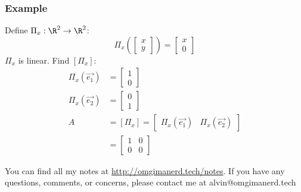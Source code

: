 \documentclass{math}
\begin{document}
\subsubsection*{Example}
Define \( \Pi_x:\R^2\to\R^2 \):
\[ \Pi_x\left(\begin{bmatrix}x \\ y\end{bmatrix}\right) = \begin{bmatrix}x \\
  0\end{bmatrix} \]
\( \Pi_x \) is linear. Find \( [\Pi_x] \):
\begin{align*}
  \Pi_x(\vec{e_1}) &= \begin{bmatrix}1 \\ 0\end{bmatrix} \\
  \Pi_x(\vec{e_2}) &= \begin{bmatrix}0 \\ 1\end{bmatrix} \\
  A &= [\Pi_x] = \begin{bmatrix}
    \Pi_x(\vec{e_1}) & \Pi_x(\vec{e_2})
  \end{bmatrix} \\
  &= \begin{bmatrix}
    1 & 0 \\
    0 & 0
  \end{bmatrix}
\end{align*}

\begin{center}
  You can find all my notes at \url{http://omgimanerd.tech/notes}. If you have
  any questions, comments, or concerns, please contact me at
  alvin@omgimanerd.tech
\end{center}
\end{document}
